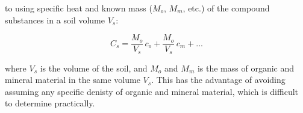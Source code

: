 \documentclass[11pt]{article}
\begin{document}
\begin{enumerate}
to using specific heat and known mass ($M_o$, $M_m$, etc.) of the compound substances in a soil volume $V_s$:

\begin{displaymath} 
C_s = \frac{M_o}{V_s} \,c_o  + \frac{M_o}{V_s} \,c_m + ...
\end{displaymath}

where $V_s$ is the volume of the soil, and $M_o$ and $M_m$ is the mass of organic and mineral material in the same volume $V_s$. This has the advantage of avoiding assuming any specific denisty of organic and mineral material, which is difficult to determine practically.

\end{enumerate}
\end{document}
